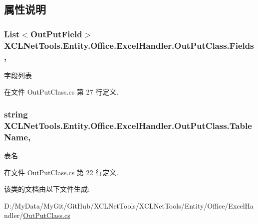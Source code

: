 \subsection{属性说明}
\hypertarget{class_x_c_l_net_tools_1_1_entity_1_1_office_1_1_excel_handler_1_1_out_put_class_a3efddb66ca15bab7aa2b15f80d59fa06}{
\subsubsection[{Fields}]{\setlength{\rightskip}{0pt plus 5cm}List$<${\bf Out\-Put\-Field}$>$ X\-C\-L\-Net\-Tools.\-Entity.\-Office.\-Excel\-Handler.\-Out\-Put\-Class.\-Fields\hspace{0.3cm}{\ttfamily [get]}, {\ttfamily [set]}}}\label{class_x_c_l_net_tools_1_1_entity_1_1_office_1_1_excel_handler_1_1_out_put_class_a3efddb66ca15bab7aa2b15f80d59fa06}


字段列表 



在文件 Out\-Put\-Class.\-cs 第 27 行定义.

\hypertarget{class_x_c_l_net_tools_1_1_entity_1_1_office_1_1_excel_handler_1_1_out_put_class_afdbc40e9ef162503cbf1ebea55728c59}{
\subsubsection[{Table\-Name}]{\setlength{\rightskip}{0pt plus 5cm}string X\-C\-L\-Net\-Tools.\-Entity.\-Office.\-Excel\-Handler.\-Out\-Put\-Class.\-Table\-Name\hspace{0.3cm}{\ttfamily [get]}, {\ttfamily [set]}}}\label{class_x_c_l_net_tools_1_1_entity_1_1_office_1_1_excel_handler_1_1_out_put_class_afdbc40e9ef162503cbf1ebea55728c59}


表名 



在文件 Out\-Put\-Class.\-cs 第 22 行定义.



该类的文档由以下文件生成\-:\begin{DoxyCompactItemize}
\item 
D\-:/\-My\-Data/\-My\-Git/\-Git\-Hub/\-X\-C\-L\-Net\-Tools/\-X\-C\-L\-Net\-Tools/\-Entity/\-Office/\-Excel\-Handler/\hyperlink{_out_put_class_8cs}{Out\-Put\-Class.\-cs}\end{DoxyCompactItemize}
